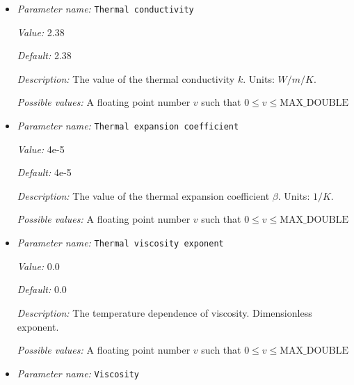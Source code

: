 \begin{itemize}
{\it Possible values:} A floating point number $v$ such that $0 \leq v \leq \text{MAX\_DOUBLE}$
\item {\it Parameter name:} {\tt Thermal conductivity}
\label{parameters:Material model/Latent heat/Thermal conductivity}
\label{parameters:Material_20model/Latent_20heat/Thermal_20conductivity}


{\it Value:} 2.38


{\it Default:} 2.38


{\it Description:} The value of the thermal conductivity $k$. Units: $W/m/K$.


{\it Possible values:} A floating point number $v$ such that $0 \leq v \leq \text{MAX\_DOUBLE}$
\item {\it Parameter name:} {\tt Thermal expansion coefficient}
\label{parameters:Material model/Latent heat/Thermal expansion coefficient}
\label{parameters:Material_20model/Latent_20heat/Thermal_20expansion_20coefficient}


{\it Value:} 4e-5


{\it Default:} 4e-5


{\it Description:} The value of the thermal expansion coefficient $\beta$. Units: $1/K$.


{\it Possible values:} A floating point number $v$ such that $0 \leq v \leq \text{MAX\_DOUBLE}$
\item {\it Parameter name:} {\tt Thermal viscosity exponent}
\label{parameters:Material model/Latent heat/Thermal viscosity exponent}
\label{parameters:Material_20model/Latent_20heat/Thermal_20viscosity_20exponent}


{\it Value:} 0.0


{\it Default:} 0.0


{\it Description:} The temperature dependence of viscosity. Dimensionless exponent.


{\it Possible values:} A floating point number $v$ such that $0 \leq v \leq \text{MAX\_DOUBLE}$
\item {\it Parameter name:} {\tt Viscosity}
\label{parameters:Material model/Latent heat/Viscosity}
\label{parameters:Material_20model/Latent_20heat/Viscosity}



\end{itemize}

